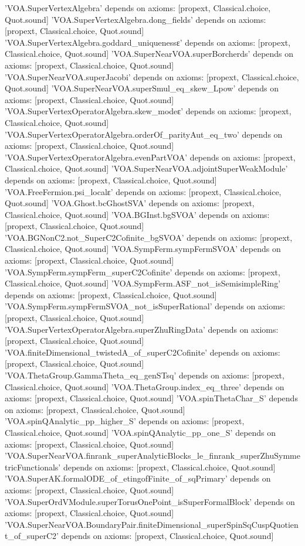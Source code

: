 \begin{plaincode}
'VOA.SuperVertexAlgebra' depends on axioms: [propext, Classical.choice, Quot.sound]
'VOA.SuperVertexAlgebra.dong_fields' depends on axioms: [propext, Classical.choice, Quot.sound]
'VOA.SuperVertexAlgebra.goddard_uniquenessε' depends on axioms: [propext, Classical.choice, Quot.sound]
'VOA.SuperNearVOA.superBorcherds' depends on axioms: [propext, Classical.choice, Quot.sound]
'VOA.SuperNearVOA.superJacobi' depends on axioms: [propext, Classical.choice, Quot.sound]
'VOA.SuperNearVOA.superSmul_eq_skew_Lpow' depends on axioms: [propext, Classical.choice, Quot.sound]
'VOA.SuperVertexOperatorAlgebra.skew_modeε' depends on axioms: [propext, Classical.choice, Quot.sound]
'VOA.SuperVertexOperatorAlgebra.orderOf_parityAut_eq_two' depends on axioms: [propext, Classical.choice, Quot.sound]
'VOA.SuperVertexOperatorAlgebra.evenPartVOA' depends on axioms: [propext, Classical.choice, Quot.sound]
'VOA.SuperNearVOA.adjointSuperWeakModule' depends on axioms: [propext, Classical.choice, Quot.sound]
'VOA.FreeFermion.psi_localε' depends on axioms: [propext, Classical.choice, Quot.sound]
'VOA.Ghost.bcGhostSVA' depends on axioms: [propext, Classical.choice, Quot.sound]
'VOA.BGInst.bgSVOA' depends on axioms: [propext, Classical.choice, Quot.sound]
'VOA.BGNonC2.not_SuperC2Cofinite_bgSVOA' depends on axioms: [propext, Classical.choice, Quot.sound]
'VOA.SympFerm.sympFermSVOA' depends on axioms: [propext, Classical.choice, Quot.sound]
'VOA.SympFerm.sympFerm_superC2Cofinite' depends on axioms: [propext, Classical.choice, Quot.sound]
'VOA.SympFerm.ASF_not_isSemisimpleRing' depends on axioms: [propext, Classical.choice, Quot.sound]
'VOA.SympFerm.sympFermSVOA_not_isSuperRational' depends on axioms: [propext, Classical.choice, Quot.sound]
'VOA.SuperVertexOperatorAlgebra.superZhuRingData' depends on axioms: [propext, Classical.choice, Quot.sound]
'VOA.finiteDimensional_twistedA_of_superC2Cofinite' depends on axioms: [propext, Classical.choice, Quot.sound]
'VOA.ThetaGroup.GammaTheta_eq_genSTsq' depends on axioms: [propext, Classical.choice, Quot.sound]
'VOA.ThetaGroup.index_eq_three' depends on axioms: [propext, Classical.choice, Quot.sound]
'VOA.spinThetaChar_S' depends on axioms: [propext, Classical.choice, Quot.sound]
'VOA.spinQAnalytic_pp_higher_S' depends on axioms: [propext, Classical.choice, Quot.sound]
'VOA.spinQAnalytic_pp_one_S' depends on axioms: [propext, Classical.choice, Quot.sound]
'VOA.SuperNearVOA.finrank_superAnalyticBlocks_le_finrank_superZhuSymmetricFunctionals' depends on axioms: [propext, Classical.choice, Quot.sound]
'VOA.SuperAK.formalODE_of_etingofFinite_of_sqPrimary' depends on axioms: [propext, Classical.choice, Quot.sound]
'VOA.SuperOrdVModule.superTorusOnePoint_isSuperFormalBlock' depends on axioms: [propext, Classical.choice, Quot.sound]
'VOA.SuperNearVOA.BoundaryPair.finiteDimensional_superSpinSqCuspQuotient_of_superC2' depends on axioms: [propext, Classical.choice, Quot.sound]
\end{plaincode}

